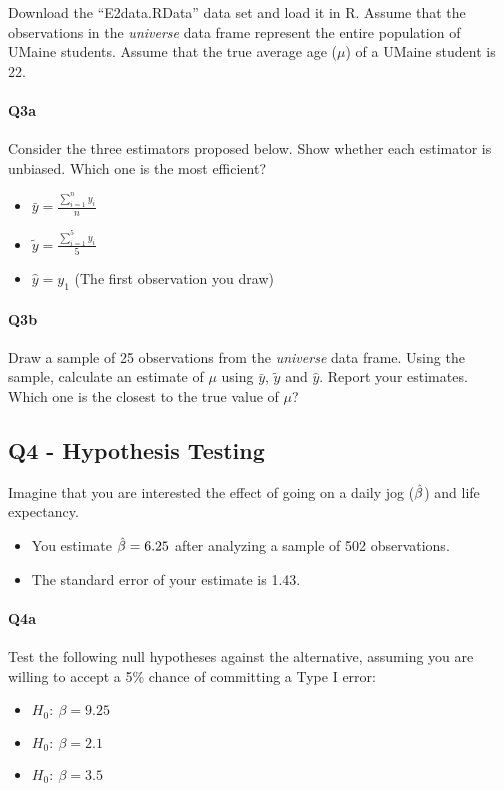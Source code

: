 \documentclass[12pt]{article}		%
\begin{document}
Download the ``E2data.RData'' data set and load it in R. Assume that the observations in the \textit{universe} data frame represent the entire population of UMaine students. Assume that the true average age ($\mu$) of a UMaine student is 22.

\vspace{.25cm}

\paragraph*{Q3a}
Consider the three estimators proposed below. Show whether each estimator is unbiased. Which one is the most efficient?

\begin{itemize}
	\item $\bar{y} = \frac{\sum_{i=1}^n y_i}{n}$
	\item $\tilde{y} = \frac{\sum_{i=1}^{5} y_i}{5}$
	\item $\hat{y}=y_1$ (The first observation you draw)
\end{itemize} 

\vspace{2cm}

\paragraph*{Q3b}
Draw a sample of 25 observations from the \textit{universe} data frame. Using the sample, calculate an estimate of $\mu$ using $\bar{y}$, $\tilde{y}$ and $\hat{y}$. Report your estimates. Which one is the closest to the true value of $\mu$?


\clearpage

\subsection*{Q4 - Hypothesis Testing}

Imagine that you are interested the effect of going on a daily jog ($\operatorname{\hat{\beta}}$) and life expectancy. 

\begin{itemize}
	\item[] You estimate $\operatorname{\hat{\beta}} = 6.25$ after analyzing a sample of 502 observations. 
	\item[] The standard error of your estimate is 1.43. 
\end{itemize}


\paragraph*{Q4a} Test the following null hypotheses against the alternative, assuming you are willing to accept a 5\% chance of committing a Type I error:
\begin{itemize}
	\item[] $H_0: \: \beta=9.25$
	\item[] $H_0: \: \beta=2.1$
	\item[] $H_0: \: \beta=3.5$
\end{itemize}
\end{document}

